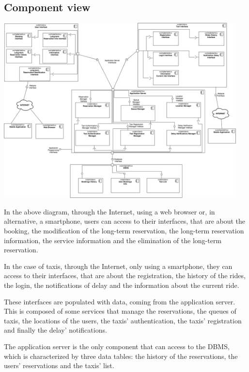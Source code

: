 \subsection{Component view}
	\begin{center}
		\includegraphics[width=0.95\textwidth]{./images/component_view.png}
	\end{center}
	
	In the above diagram, through the Internet, using a web browser or, in alternative, a smartphone, users can access to their interfaces, that are about the booking, the modification of the long-term reservation, the long-term reservation information, the service information and the elimination of the long-term reservation. 
	
	In the case of taxis, through the Internet, only using a smartphone, they can access to their interfaces, that are about the registration, the history of the rides, the login, the notifications of delay and the information about the current ride.
	
	These interfaces are populated with data, coming from the application server. This is composed of some services that manage the reservations, the queues of taxis, the locations of the users, the taxis' authentication, the taxis' registration and finally the delay' notifications.
	
	The application server is the only component that can access to the DBMS, which is characterized by three data tables: the history of the reservations, the users' reservations and the taxis' list.
